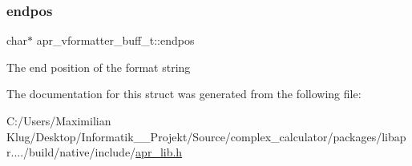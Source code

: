 \subsubsection{\texorpdfstring{endpos}{endpos}}
{\footnotesize\ttfamily char$\ast$ apr\+\_\+vformatter\+\_\+buff\+\_\+t\+::endpos}

The end position of the format string 

The documentation for this struct was generated from the following file\+:\begin{DoxyCompactItemize}
\item 
C\+:/\+Users/\+Maximilian Klug/\+Desktop/\+Informatik\+\_\+\_\+\+Projekt/\+Source/complex\+\_\+calculator/packages/libapr..../build/native/include/\mbox{\hyperlink{apr__lib_8h}{apr\+\_\+lib.\+h}}\end{DoxyCompactItemize}
